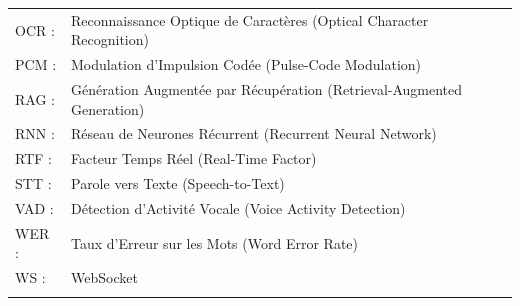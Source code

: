 \documentclass[12pt]{report}
\newcommand{\hlinecolor}{\arrayrulecolor{myColor}\hline\arrayrulecolor{black}}
\begin{document}
\begin{tabular}{p{} p{}}
\raggedright \textcolor{myColor}{OCR :} & Reconnaissance Optique de Caractères (Optical Character Recognition) \\
\raggedright \textcolor{myColor}{PCM :} & Modulation d'Impulsion Codée (Pulse-Code Modulation) \\
\raggedright \textcolor{myColor}{RAG :} & Génération Augmentée par Récupération (Retrieval-Augmented Generation) \\
\raggedright \textcolor{myColor}{RNN :} & Réseau de Neurones Récurrent (Recurrent Neural Network) \\
\raggedright \textcolor{myColor}{RTF :} & Facteur Temps Réel (Real-Time Factor) \\
\raggedright \textcolor{myColor}{STT :} & Parole vers Texte (Speech-to-Text) \\
\raggedright \textcolor{myColor}{VAD :} & Détection d'Activité Vocale (Voice Activity Detection) \\
\raggedright \textcolor{myColor}{WER :} & Taux d'Erreur sur les Mots (Word Error Rate) \\
\raggedright \textcolor{myColor}{WS :} & WebSocket \\
\hlinecolor
\end{tabular}
\newpage
\end{document}
